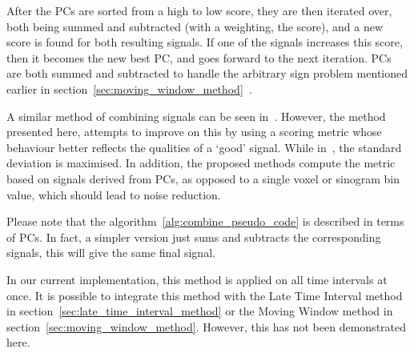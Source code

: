             After the \glspl{PC} are sorted from a high to low score, they are then iterated over, both being summed and subtracted (with a weighting, the score), and a new score is found for both resulting signals. If one of the signals increases this score, then it becomes the new best \gls{PC}, and goes forward to the next iteration. \glspl{PC} are both summed and subtracted to handle the arbitrary sign problem mentioned earlier in section~\ref{sec:moving_window_method}~\parencite{Bertolli2017}.
            
            A similar method of combining signals can be seen in~\parencite{Kesner2010AMethods}. However, the method presented here, attempts to improve on this by using a scoring metric whose behaviour better reflects the qualities of a `good' signal. While in~\parencite{Kesner2010AMethods}, the standard deviation is maximised. In addition, the proposed methods compute the metric based on signals derived from \glspl{PC}, as opposed to a single voxel or sinogram bin value, which should lead to noise reduction.
            
            Please note that the algorithm~\ref{alg:combine_pseudo_code} is described in terms of \glspl{PC}. In fact, a simpler version just sums and subtracts the corresponding signals, this will give the same final signal.
        
            In our current implementation, this method is applied on all time intervals at once. It is possible to integrate this method with the Late Time Interval method in section~\ref{sec:late_time_interval_method} or the Moving Window method in section~\ref{sec:moving_window_method}. However, this has not been demonstrated here.
            
